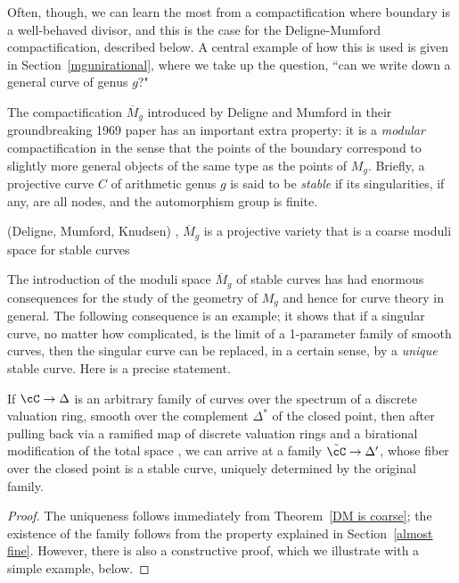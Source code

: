 Often, though, we can learn the most from a compactification where boundary is a well-behaved divisor, and this is the case for the Deligne-Mumford compactification, described below. A central example of how this is used is given in Section~\ref{mgunirational}, where we take up the question, ``can we write down a general curve of genus $g$?" 

The compactification $\overline M_g$ introduced by Deligne and Mumford in their groundbreaking 1969 paper has an important extra property: it is a \emph{modular}  compactification in the sense that the points of the boundary correspond to slightly more general
objects of the same type as the points of $M_g$. 
Briefly, a projective curve $C$ of arithmetic genus $g$ is said to be \emph{stable} if its singularities, if any, are all nodes, and the automorphism group is finite.

\begin{theorem}(Deligne, Mumford, Knudsen) \cite{Deligne-Mumford}, \cite{MR702954}\label{DM is coarse}
$\overline M_g$ is a projective variety that is a coarse moduli space for stable curves 
\end{theorem}
 
The introduction of the moduli space $\overline M_g$ of stable curves has had enormous consequences for the study of the geometry of $M_g$ and hence for curve theory in general. The following consequence is an example; it shows that if a singular curve, no matter how complicated, is the limit of a 1-parameter family of smooth curves, then the singular curve can be replaced, in a certain sense, by a \emph{unique} stable curve. Here is a precise statement.

\begin{theorem}
If $\cC \to \Delta$ is an arbitrary family of curves over the spectrum of a discrete valuation ring, smooth over the complement $\Delta^*$ of the closed point, then after pulling back via a ramified map of
discrete valuation rings and a birational modification of the total space , we can arrive at a family $\tilde \cC \to \Delta'$, whose fiber over the closed point is a stable curve, uniquely determined by the original family.
\end{theorem}

\begin{proof} The uniqueness follows immediately from Theorem~\ref{DM is coarse}; the existence of the family follows from the property explained in Section~\ref{almost fine}. However, there is also a constructive proof, which we  illustrate with a simple example, below.
\end{proof}

